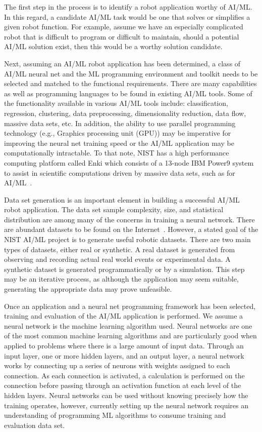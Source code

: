 The first step in the process is to identify a robot application worthy of AI/ML. In this regard, a candidate AI/ML task would be one that solves or simplifies a given robot function. For example, assume we have an especially complicated robot that is difficult to program or difficult to maintain, should a potential AI/ML solution exist, then this would be a worthy solution candidate. 

Next, assuming an AI/ML robot application has been determined, a class of AI/ML neural net and the ML programming environment and toolkit needs to be selected and matched to the functional requirements. There are many capabilities as well as programming languages to be found in existing AI/ML tools. Some of the functionality available in various  AI/ML tools include: classification, regression, clustering, data preprocessing, dimensionality reduction, data flow, massive data sets, etc. In addition, the ability to use parallel programming technology (e.g., Graphics processing unit (GPU)) may be imperative for improving the neural net training speed  or the AI/ML application may be computationally intractable. To that note, NIST has a high performance computing platform called Enki which consists of a 13-node IBM Power9 system to assist in scientific computations driven by massive data sets, such as for AI/ML~\cite{enki}. 

Data set generation is an important element in building a successful AI/ML robot application. The data set sample complexity, size, and statistical distribution are among many of the concerns in training a neural network. There are abundant datasets to be found on the Internet~\cite{KaggleDatasets,UCIrvine,VisualData,DataGov}. However, a stated goal of the NIST AI/ML project is to generate useful robotic datasets.  There are two main types of datasets, either real or synthetic. A real dataset is generated from observing and recording actual real world events or experimental data. A synthetic dataset is generated programmatically or by a simulation.  This step may be an iterative process, as although the application may seem suitable, generating the appropriate data may prove unfeasible.


Once an application and a neural net programming framework has been selected, training and evaluation of the AI/ML application is performed. We assume a neural network is the machine learning algorithm used. Neural networks are one of the most common machine learning algorithms and are particularly good when applied to problems where there is a large amount of input data.  Through an input layer, one or more hidden layers, and an output layer, a neural network works by connecting up a series of neurons with weights assigned to each connection. As each connection is activated, a calculation is performed on the connection before passing through an activation function at each level of the hidden layers. Neural networks can be used without knowing precisely how the training operates, however, currently setting up the neural network requires an understanding of programming ML algorithms to consume training and evaluation data set. 


